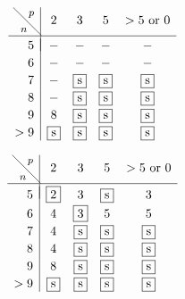 \documentclass[a4paper, 11pt]{amsart}
\theoremstyle{plain}
\theoremstyle{definition}
\theoremstyle{remark}
\DeclareMathOperator{\Alt}{Alt}
\begin{document}
\begin{table}

\begin{minipage}{.49\linewidth}
{\small
\[\begin{array}{r|cccc} 
\hbox{\footnotesize \diagbox[width = 0.8cm,height = 0.8cm]{$n$}{$p$}}  
    & 2        & 3        & 5        & >5 \text{ or } 0 \\  \hline
\\[-10pt]
5   & -        & -        & -        & - \\[2pt] 
6   & -        & -        &  -       & - \\[2pt]
7   & -        & \fbox{s} & \fbox{s} & \fbox{s} \\[2pt]
8   & -        & \fbox{s} & \fbox{s} & \fbox{s} \\[2pt]
9   & 8        & \fbox{s} & \fbox{s} & \fbox{s} \\[2pt]
>9 & \fbox{s} & \fbox{s} & \fbox{s} & \fbox{s} \\
\end{array}\]
}
\caption*{Results of \cite{CDW23}}
\end{minipage}
\begin{minipage}{.49\linewidth}
{\small
\[\begin{array}{r|cccc}
\hbox{\footnotesize \diagbox[width = 0.8cm,height = 0.8cm]{$n$}{$p$}}   
    & 2        & 3        & 5        & >5 \text{ or } 0 \\  \hline
\\[-10pt]
5   & \fbox{2} & 3        & \fbox{s}        & 3 \\[2pt] 
6   & 4        & \fbox{3} &  5       & 5 \\[2pt]
7   & 4        & \fbox{s} & \fbox{s} & \fbox{s} \\[2pt]
8   & 4        & \fbox{s} & \fbox{s} & \fbox{s} \\[2pt]
9   & 8        & \fbox{s} & \fbox{s} & \fbox{s} \\[2pt]
>9 & \fbox{s} & \fbox{s} & \fbox{s} & \fbox{s} \\
\end{array}\]
}
\caption*{Incorporating our results}
\end{minipage}
\caption{Minimal dimensions of faithful $\Alt(n)$-modules in characteristic $p$: ``s'' stands for (reduced) ``standard'' (see \S\S~\ref{ss.FamiliarModules}) and as a dimension translates to $n-2$ if $p$ is a prime dividing $n$ and as $n-1$ otherwise. An entry in the table is boxed if the modules of least dimension have been classified.}
\label{tab.SmallDimension}
\end{table}
 
\end{document}
